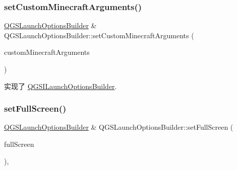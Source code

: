 \mbox{\label{class_q_g_s_launch_options_builder_a2b8fdfaea89a1a59ee8a1ae39b1ec3ff}} 
\subsubsection{\texorpdfstring{set\+Custom\+Minecraft\+Arguments()}{setCustomMinecraftArguments()}}
{\footnotesize\ttfamily \mbox{\hyperlink{class_q_g_s_launch_options_builder}{Q\+G\+S\+Launch\+Options\+Builder}} \& Q\+G\+S\+Launch\+Options\+Builder\+::set\+Custom\+Minecraft\+Arguments (\begin{DoxyParamCaption}\item[{const Q\+Map$<$ Q\+String, Q\+String $>$ \&}]{custom\+Minecraft\+Arguments }\end{DoxyParamCaption})\hspace{0.3cm}{\ttfamily [virtual]}}



实现了 \mbox{\hyperlink{class_q_g_s_i_launch_options_builder_a3db1cb775f5004d68550c3f7e31f3cb1}{Q\+G\+S\+I\+Launch\+Options\+Builder}}.

\mbox{\label{class_q_g_s_launch_options_builder_a8d77cb303f2d490ef5eea478518c7d8d}} 
\subsubsection{\texorpdfstring{set\+Full\+Screen()}{setFullScreen()}}
{\footnotesize\ttfamily \mbox{\hyperlink{class_q_g_s_launch_options_builder}{Q\+G\+S\+Launch\+Options\+Builder}} \& Q\+G\+S\+Launch\+Options\+Builder\+::set\+Full\+Screen (\begin{DoxyParamCaption}\item[{const bool}]{full\+Screen }\end{DoxyParamCaption})\hspace{0.3cm}{\ttfamily [override]}, {\ttfamily [virtual]}}




